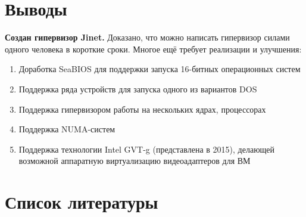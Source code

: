 \documentclass[a4paper,12pt]{extarticle}
\begin{document}
	\section{Выводы}
	\textbf{Создан гипервизор Jinet.} Доказано, что можно написать гипервизор силами одного человека в короткие сроки. Многое ещё требует реализации и улучшения:
	\begin{enumerate}
		\item Доработка SeaBIOS для поддержки запуска 16-битных операционных систем
		\item Поддержка ряда устройств для запуска одного из вариантов DOS
		\item Поддержка гипервизором работы на нескольких ядрах, процессорах
		\item Поддержка NUMA-систем
		\item Поддержка технологии Intel GVT-g (представлена в 2015), делающей возможной аппаратную виртуализацию видеоадаптеров для ВМ
	\end{enumerate}
	\section{Список литературы}
	\nocite{*}
	\renewcommand{\section}[2]{}%
	
	
\end{document}
